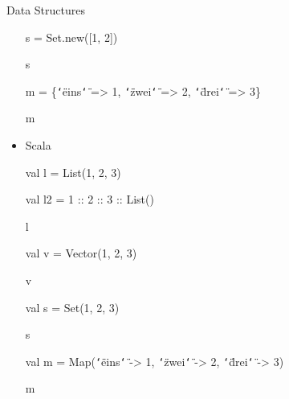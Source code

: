 \documentclass{beamer}
\renewcommand{\textquotedbl}{\texttt{\char`\"}}
\begin{document}
\begin{frame}[allowframebreaks]{Data Structures}
\begin{itemize}
\begin{small}
{\ttfamily\color{black}
s = \textcolor[rgb]{0.13333334,0.54509807,0.13333334}{Set}.new([1, 2])}

{\ttfamily\color{black}
s}

{\ttfamily\color{black}
m =
\{\textcolor[rgb]{0.54509807,0.13333334,0.32156864}{{\textquotedbl}eins{\textquotedbl}}
={\textgreater} 1,
\textcolor[rgb]{0.54509807,0.13333334,0.32156864}{{\textquotedbl}zwei{\textquotedbl}}
={\textgreater} 2,
\textcolor[rgb]{0.54509807,0.13333334,0.32156864}{{\textquotedbl}drei{\textquotedbl}}
={\textgreater} 3\}}

{\ttfamily\color{black}
m}
\end{small}
  \item Scala\\
\begin{small}
{\ttfamily\color{black}
%
\textcolor[rgb]{0.49803922,0.0,0.49803922}{val}
\textcolor[rgb]{0.627451,0.32156864,0.1764706}{l} = List(1, 2, 3)}

{\ttfamily\color{black}
\textcolor[rgb]{0.49803922,0.0,0.49803922}{val}
\textcolor[rgb]{0.627451,0.32156864,0.1764706}{l2} = 1 :: 2 :: 3 ::
List()}

{\ttfamily\color{black}
l}

{\ttfamily\color{black}
\textcolor[rgb]{0.49803922,0.0,0.49803922}{val}
\textcolor[rgb]{0.627451,0.32156864,0.1764706}{v} = Vector(1, 2, 3)}

{\ttfamily\color{black}
v}

{\ttfamily\color{black}
\textcolor[rgb]{0.49803922,0.0,0.49803922}{val}
\textcolor[rgb]{0.627451,0.32156864,0.1764706}{s} = Set(1, 2, 3)}

{\ttfamily\color{black}
s}

{\ttfamily\color{black}
\textcolor[rgb]{0.49803922,0.0,0.49803922}{val}
\textcolor[rgb]{0.627451,0.32156864,0.1764706}{m} =
Map(\textcolor[rgb]{0.54509807,0.13333334,0.32156864}{{\textquotedbl}eins{\textquotedbl}}
-{\textgreater} 1,
\textcolor[rgb]{0.54509807,0.13333334,0.32156864}{{\textquotedbl}zwei{\textquotedbl}}
-{\textgreater} 2,
\textcolor[rgb]{0.54509807,0.13333334,0.32156864}{{\textquotedbl}drei{\textquotedbl}}
-{\textgreater} 3)}

{\ttfamily\color{black}
m}
\end{small}
  \end{itemize}
\end{frame}
\end{document}
